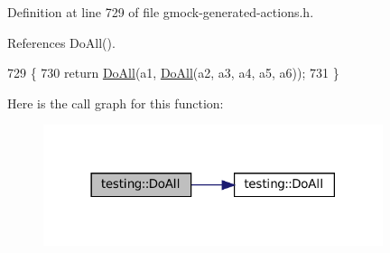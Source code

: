 Definition at line 729 of file gmock-\/generated-\/actions.\+h.



References Do\+All().


\begin{DoxyCode}
729                                                                               \{
730   \textcolor{keywordflow}{return} \hyperlink{namespacetesting_a79ac222c485c7aa0a1774bee17dadb10}{DoAll}(a1, \hyperlink{namespacetesting_a79ac222c485c7aa0a1774bee17dadb10}{DoAll}(a2, a3, a4, a5, a6));
731 \}
\end{DoxyCode}
Here is the call graph for this function\+:
\nopagebreak
\begin{figure}[H]
\begin{center}
\leavevmode
\includegraphics[width=282pt]{namespacetesting_aa6c87c8d7520fb333f1559487d3e06e9_cgraph}
\end{center}
\end{figure}
\mbox{\label{namespacetesting_aadfaf4eb9897dcabe067b1d882febc86}} 
